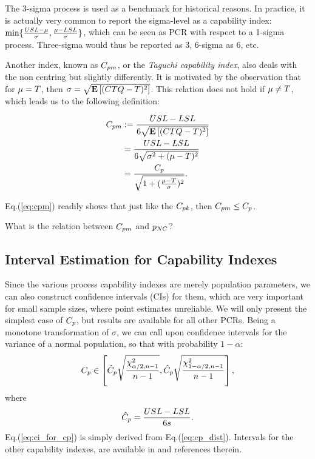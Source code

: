 The 3-sigma process is used as a benchmark for historical reasons. 
In practice, it is actually very common to report the sigma-level as a capability index: $\min\{ \frac{USL-\mu}{\sigma},\frac{\mu-LSL}{\sigma} \}$, which can be seen as PCR with respect to a 1-sigma process.
Three-sigma would thus be reported as $3$, 6-sigma as $6$, etc.


Another index, known as $\cpm$, or the \emph{Taguchi capability index}, also deals with the non centring but slightly differently. 
It is motivated by the observation that for $\mu=T$, then $\sigma=\sqrt{\mathbf{E}\left[ (CTQ-T)^2 \right]}$. This relation does not hold if $\mu \not=T$, which leads us to the following definition:
\begin{definition}[$\cpm$]
\begin{align}
		C_{pm} &:= \frac{USL-LSL}{6 \sqrt{\mathbf{E}\left[ (CTQ-T)^2 \right]}} \\
		&= 	\frac{USL-LSL}{6 \sqrt{\sigma^2+(\mu-T)^2}} \\ 
		&= \frac{C_p}{\sqrt{1+(\frac{\mu-T}{\sigma})^2}}. \label{eq:cpm}
\end{align}
\end{definition}
Eq.(\ref{eq:cpm}) readily shows that just like the $C_{pk}$, then $C_{pm} \leq C_p$. 

\begin{think}
What is the relation between $\cpm$ and $p_{NC}$?
\end{think}








\subsection{Interval Estimation for Capability Indexes}
Since the various process capability indexes are merely population parameters, we can also construct confidence intervals (CIs) for them, which are very important for small sample sizes, where point estimates unreliable.
We will only present the simplest case of $C_p$, but results are available for all other PCRs. Being a monotone transformation of $\sigma$, we can call upon confidence intervals for the variance of a normal population, so that with probability $1-\alpha$:
\begin{align}
\label{eq:ci_for_cp}
	C_p \in \left[ 
		\hat{C}_p \sqrt{\frac{\chi^2_{\alpha/2,n-1}}{n-1}},
		\hat{C}_p \sqrt{\frac{\chi^2_{1-\alpha/2,n-1}}{n-1}}
	\right],
\end{align}
where 
\begin{align}
\label{eq:cpHat}
\hat{C}_p = \frac{USL-LSL}{6 s}.
\end{align}
Eq.(\ref{eq:ci_for_cp}) is simply derived from Eq.(\ref{eq:cp_dist}).
Intervals for the other capability indexes, are available in \cite{montgomery_introduction_2007} and references therein. 




